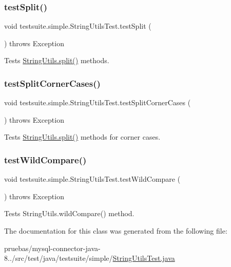 \subsubsection{\texorpdfstring{test\+Split()}{testSplit()}}
{\footnotesize\ttfamily void testsuite.\+simple.\+String\+Utils\+Test.\+test\+Split (\begin{DoxyParamCaption}{ }\end{DoxyParamCaption}) throws Exception}

Tests \mbox{\hyperlink{classcom_1_1mysql_1_1cj_1_1util_1_1_string_utils_a7415fcd4dc83631e7840f2784c2332f9}{String\+Utils.\+split()}} methods. \mbox{\label{classtestsuite_1_1simple_1_1_string_utils_test_a99205fb8cc261bc7c1bb4968a0cca52a}} 
\subsubsection{\texorpdfstring{test\+Split\+Corner\+Cases()}{testSplitCornerCases()}}
{\footnotesize\ttfamily void testsuite.\+simple.\+String\+Utils\+Test.\+test\+Split\+Corner\+Cases (\begin{DoxyParamCaption}{ }\end{DoxyParamCaption}) throws Exception}

Tests \mbox{\hyperlink{classcom_1_1mysql_1_1cj_1_1util_1_1_string_utils_a7415fcd4dc83631e7840f2784c2332f9}{String\+Utils.\+split()}} methods for corner cases. \mbox{\label{classtestsuite_1_1simple_1_1_string_utils_test_a2c88f5e437abcdfdb41c193ff8eb2841}} 
\subsubsection{\texorpdfstring{test\+Wild\+Compare()}{testWildCompare()}}
{\footnotesize\ttfamily void testsuite.\+simple.\+String\+Utils\+Test.\+test\+Wild\+Compare (\begin{DoxyParamCaption}{ }\end{DoxyParamCaption}) throws Exception}

Tests String\+Utils.\+wild\+Compare() method. 

The documentation for this class was generated from the following file\+:\begin{DoxyCompactItemize}
\item 
pruebas/mysql-\/connector-\/java-\/8../src/test/java/testsuite/simple/\mbox{\hyperlink{_string_utils_test_8java}{String\+Utils\+Test.\+java}}\end{DoxyCompactItemize}
